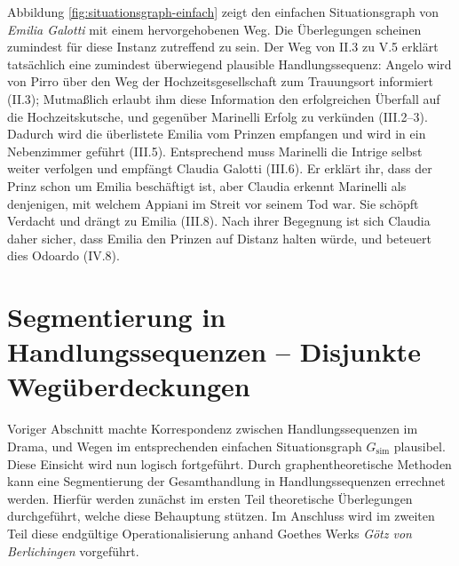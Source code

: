 \documentclass[a4paper,10pt,abstract=true,headings=small]{scrartcl}
\begin{document}
\label{pos:weg-diskussion}Abbildung \ref{fig:situationsgraph-einfach} zeigt den einfachen Situationsgraph von \emph{Emilia Galotti} mit einem hervorgehobenen Weg.
Die Überlegungen scheinen zumindest für diese Instanz zutreffend zu sein.
Der Weg von II.3 zu V.5 erklärt tatsächlich eine zumindest überwiegend plausible Handlungssequenz:
Angelo wird von Pirro über den Weg der Hochzeitsgesellschaft zum Trauungsort informiert (II.3); Mutmaßlich erlaubt ihm diese Information den erfolgreichen Überfall auf die Hochzeitskutsche, und gegenüber Marinelli Erfolg zu verkünden (III.2–3).
Dadurch wird die überlistete Emilia vom Prinzen empfangen und wird in ein Nebenzimmer geführt (III.5).
Entsprechend muss Marinelli die Intrige selbst weiter verfolgen und empfängt Claudia Galotti  (III.6).
Er erklärt ihr, dass der Prinz schon um Emilia beschäftigt ist, aber Claudia erkennt Marinelli als denjenigen, mit welchem Appiani im Streit vor seinem Tod war.
Sie schöpft Verdacht und drängt zu Emilia (III.8).
Nach ihrer Begegnung ist sich Claudia daher sicher, dass Emilia den Prinzen auf Distanz halten würde, und beteuert dies Odoardo (IV.8).






\section{Segmentierung in Handlungssequenzen – Disjunkte Wegüberdeckungen}\label{sec:segmentierung}

Voriger Abschnitt machte Korrespondenz zwischen Handlungssequenzen im Drama, und Wegen im entsprechenden einfachen Situationsgraph $G_\text{sim}$ plausibel.
Diese Einsicht wird nun logisch fortgeführt.
Durch graphentheoretische Methoden kann eine Segmentierung der Gesamthandlung in Handlungssequenzen errechnet werden.
Hierfür werden zunächst im ersten Teil theoretische Überlegungen durchgeführt, welche diese Behauptung stützen.
Im Anschluss wird im zweiten Teil diese endgültige Operationalisierung anhand Goethes Werks \emph{Götz von Berlichingen} vorgeführt.
\end{document}

